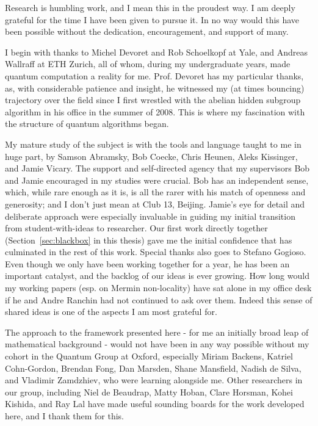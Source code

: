 \begin{acknowledgementslong}
Research is humbling work, and I mean this in the proudest way. I am deeply grateful for the time I have been given to pursue it.  In no way would this have been possible without the dedication, encouragement, and support of many.

I begin with thanks to Michel Devoret and Rob Schoelkopf at Yale, and Andreas Wallraff at ETH Zurich, all of whom, during my undergraduate years, made quantum computation a reality for me.  Prof. Devoret has my particular thanks, as, with considerable patience and insight, he witnessed my (at times bouncing) trajectory over the field since I first wrestled with the abelian hidden subgroup algorithm in his office in the summer of 2008. This is where my fascination with the structure of quantum algorithms began.

My mature study of the subject is with the tools and language taught to me in huge part, by Samson Abramsky, Bob Coecke, Chris Heunen, Aleks Kissinger, and Jamie Vicary. The support and self-directed agency that my supervisors Bob and Jamie encouraged in my studies were crucial. Bob has an independent sense, which, while rare enough as it is, is all the rarer with his match of openness and generosity; and I don't just mean at Club 13, Beijing. Jamie's eye for detail and deliberate approach were especially invaluable in guiding my initial transition from student-with-ideas to researcher. Our first work directly together (Section~\ref{sec:blackbox} in this thesis) gave me the initial confidence that has culminated in the rest of this work.  Special thanks also goes to Stefano Gogioso. Even though we only have been working together for a year, he has been an important catalyst, and the backlog of our ideas is ever growing.  How long would my working papers (esp. on Mermin non-locality) have sat alone in my office desk if he and Andre Ranchin had not continued to ask over them. Indeed this sense of shared ideas is one of the aspects I am most grateful for. 

The approach to the framework presented here - for me an initially broad leap of mathematical background - would not have been in any way possible without my cohort in the Quantum Group at Oxford, especially Miriam Backens, Katriel Cohn-Gordon, Brendan Fong, Dan Marsden, Shane Mansfield, Nadish de Silva, and Vladimir Zamdzhiev, who were learning alongside me. Other researchers in our group, including Niel de Beaudrap, Matty Hoban, Clare Horsman, Kohei Kishida, and Ray Lal have made useful sounding boards for the work developed here, and I thank them for this.


\end{acknowledgementslong}
